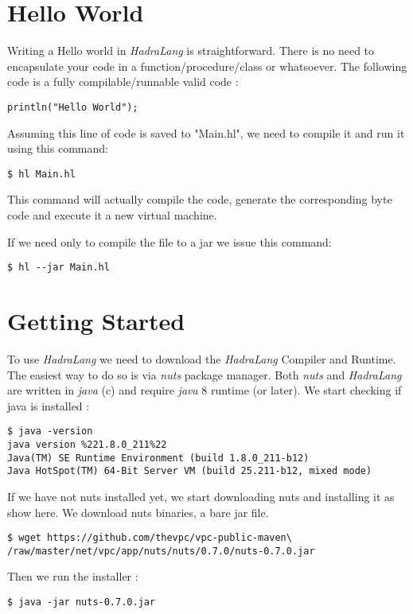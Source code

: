 \documentclass{tufte-book}
\begin{document}
        
        \section*{Hello World}
        Writing a Hello world in \textit{HadraLang} is straightforward. There is no need to encapsulate your code in a function/procedure/class or whatsoever.
        The following code is a fully compilable/runnable valid code :
        
        \begin{lstlisting}
println("Hello World");
        \end{lstlisting}
        
        Assuming this line of code is saved to "Main.hl", we need to compile it and run it using this command:
        \begin{lstlisting}
$ hl Main.hl
        \end{lstlisting}

        This command will actually compile the code, generate the corresponding byte code and execute it a new virtual machine.
        
        If we need only to compile the file to a jar we issue this command:

        \begin{lstlisting}
$ hl --jar Main.hl
        \end{lstlisting}

        \section*{Getting Started}
        To use \textit{HadraLang} we need to download the \textit{HadraLang} Compiler and Runtime. The easiest way to do so is via \textit{nuts} package manager. Both \textit{nuts} and \textit{HadraLang} are written in \textit{java} (c) and require \textit{java} 8 runtime (or later).
        We start checking if java is installed :
        \begin{lstlisting}
$ java -version
java version %221.8.0_211%22
Java(TM) SE Runtime Environment (build 1.8.0_211-b12)
Java HotSpot(TM) 64-Bit Server VM (build 25.211-b12, mixed mode)
        \end{lstlisting}
        If we have not nuts installed yet, we start downloading nuts and installing it as show here.
        We download nuts binaries, a bare jar file.
        \begin{lstlisting}
$ wget https://github.com/thevpc/vpc-public-maven\
/raw/master/net/vpc/app/nuts/nuts/0.7.0/nuts-0.7.0.jar
        \end{lstlisting}
Then we run the installer :
        \begin{lstlisting}
$ java -jar nuts-0.7.0.jar
        \end{lstlisting}
        
\end{document}
